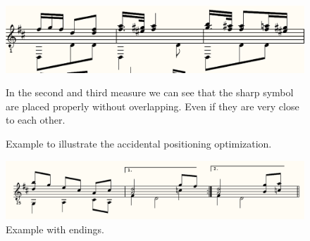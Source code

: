 \begin{figure}[h]
    \centering
    \includegraphics[scale=\renderscale]{Figures/render-Fernando-Sor-Op-32-Mazurka-1.png}
    \caption{Example to illustrate the accidental positioning optimization.}
    \label{fig:render-accidental}
    \startdescription
    In the second and third measure we can see that the sharp symbol are placed properly without overlapping. Even if they are very close to each other.
\end{figure}


\begin{figure}[h]
    \centering
    \includegraphics[scale=\renderscale]{Figures/render-Guitar-Solo-No-98-in-D-Major.png}
    \caption{Example with endings.}
    \label{fig:render-endings}
\end{figure}
